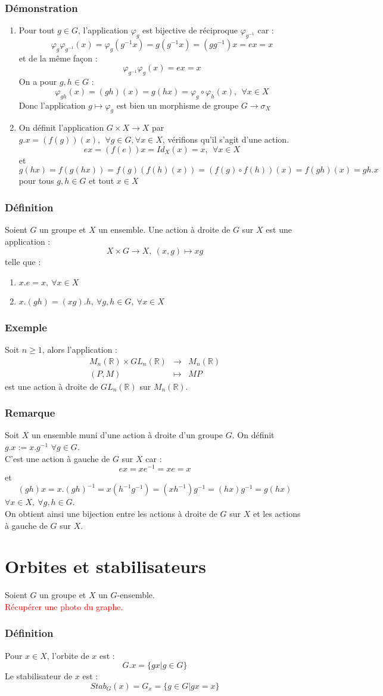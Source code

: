 \documentclass[a4paper, oneside]{report}
\newcommand{\x}{\times}
\newcommand{\R}{\mathbb{R}}
\newcommand{\defi}{\subsubsection{Définition}}
\newcommand{\dem}{\subsubsection{Démonstration}}
\newcommand{\remar}{\subsubsection{Remarque}}
\newcommand{\exem}{\subsubsection{Exemple}}
\begin{document}
\dem
\begin{enumerate}
\item Pour tout $g\in G$, l'application $\varphi_g$ est bijective de réciproque $\varphi_{g^{-1}}$ car :
$$\varphi_g\varphi_{g^{-1}}(x)=\varphi_g(g^{-1}x)=g(g^{-1}x)=(gg^{-1})x=ex=x$$
et de la même façon :
$$\varphi_{g^{-1}}\varphi_g(x)=ex=x$$
On a pour $g,h\in G$ :
$$\varphi_{gh}(x)=(gh)(x)=g(hx)=\varphi_g\circ \varphi_h(x),~~\forall x\in X$$
Donc l'application $g\mapsto \varphi_g$ est bien un morphisme de groupe $G\rightarrow \sigma_X$
\item On définit l'application $G\x X \rightarrow X$ par $g.x = (f(g))(x),~~\forall g\in G,\forall x\in X$, vérifions qu'il s'agit d'une action.\\
$$ex=(f(e))x=Id_X(x)=x,~~\forall x\in X$$
et 
$$g(hx)=f(g(hx))=f(g)(f(h)(x))=(f(g)\circ f(h) )(x)=f(gh)(x)=gh.x$$
pour tous $g,h\in G$ et tout $x\in X$
\end{enumerate}

\defi
Soient $G$ un groupe et $X$ un ensemble. Une action à droite de $G$ sur $X$ est une application :
$$X\x G\rightarrow X,~(x,g)\mapsto xg$$
telle que :
\begin{enumerate}
\item $x.e=x,~\forall x\in X$
\item $x.(gh)=(xg).h,~\forall g,h\in G,~\forall x\in X$
\end{enumerate}

\exem
Soit $n\geq 1$, alors l'application :
$$\begin{array}{lll}
M_n(\R)\x GL_n(\R)&\rightarrow & M_n(\R)\\
(P,M)&\mapsto & MP
\end{array}$$
est une action à droite de $GL_n(\R)$ sur $M_n(\R)$.

\remar
Soit $X$ un ensemble muni d'une action à droite d'un groupe $G$. On définit $g.x := x.g^{-1}$ $\forall g\in G$.\\
C'est une action à gauche de $G$ sur $X$ car :
$$ex=xe^{-1}=xe=x$$
et 
$$(gh)x=x.(gh)^{-1}=x(h^{-1}g^{-1})=(xh^{-1})g^{-1}=(hx)g^{-1}=g(hx)$$
$\forall x\in X, ~\forall g,h\in G$.\\
On obtient ainsi une bijection entre les actions à droite de $G$ sur $X$ et les actions à gauche de $G$ sur $X$.

\section{Orbites et stabilisateurs}
Soient $G$ un groupe et $X$ un $G$-ensemble.\\
\textcolor{red}{Récupérer une photo du graphe.}
\defi 
Pour $x\in X$, l'orbite de $x$ est :
$$G.x=\{gx | g\in G \}$$
Le stabilisateur de $x$ est :
$$Stab_G(x)=G_x=\{g\in G | gx=x \}$$
\end{document}
